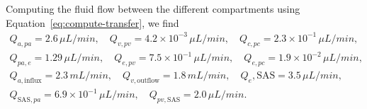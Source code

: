 \documentclass[a4paper,11pt]{article} %
\newcommand{\1}{^{(1)}}
\newcommand{\2}{^{(2)}}
\newcommand{\Cinulin}{$\prescript{14}{}{\text{C}}$-inulin }
\newcommand{\commentout}[1]{}
\providecommand{\DIFdeltex}[1]{{\protect\color{red}\sout{#1}}}                      %
\providecommand{\DIFaddbegin}{} %
\providecommand{\DIFaddend}{} %
\providecommand{\DIFdelbegin}{} %
\providecommand{\DIFdelend}{} %
\providecommand{\DIFdel}[1]{\texorpdfstring{\DIFdeltex{#1}}{}} %
\newcommand{\DIFscaledelfig}{0.5}
\newlength{\DIFdelgraphicswidth} %
\newlength{\DIFdelgraphicsheight} %
\newcommand{\DIFaddincludegraphics}[2][]{{\color{blue}\fbox{\DIFOincludegraphics[#1]{#2}}}} %
\newcommand{\DIFdelincludegraphics}[2][]{%
\sbox{\DIFdelgraphicsbox}{\DIFOincludegraphics[#1]{#2}}%
\settoboxwidth{\DIFdelgraphicswidth}{\DIFdelgraphicsbox} %
\settoboxtotalheight{\DIFdelgraphicsheight}{\DIFdelgraphicsbox} %
\scalebox{\DIFscaledelfig}{%
\parbox[b]{\DIFdelgraphicswidth}{\usebox{\DIFdelgraphicsbox}\\[-\baselineskip] \rule{\DIFdelgraphicswidth}{0em}}\llap{\resizebox{\DIFdelgraphicswidth}{\DIFdelgraphicsheight}{%
\setlength{\unitlength}{\DIFdelgraphicswidth}%
\begin{picture}(1,1)%
\thicklines\linethickness{2pt} %
{\color[rgb]{1,0,0}\put(0,0){\framebox(1,1){}}}%
{\color[rgb]{1,0,0}\put(0,0){\line( 1,1){1}}}%
{\color[rgb]{1,0,0}\put(0,1){\line(1,-1){1}}}%
\end{picture}%
}\hspace*{3pt}}} %
} %
\DeclareRobustCommand{\DIFaddbegin}{\DIFOaddbegin \let\includegraphics\DIFaddincludegraphics} %
\DeclareRobustCommand{\DIFaddend}{\DIFOaddend \let\includegraphics\DIFOincludegraphics} %
\DeclareRobustCommand{\DIFdelbegin}{\DIFOdelbegin \let\includegraphics\DIFdelincludegraphics} %
\DeclareRobustCommand{\DIFdelend}{\DIFOaddend \let\includegraphics\DIFOincludegraphics} %
\begin{document}
Computing the fluid flow between the different compartments using Equation~\eqref{eq:compute-transfer}, we find 
\[
\DIFdelbegin %
\DIFdelend \DIFaddbegin \begin{aligned}
    Q_{a,pa} = 2.6 \, \si{\mu L/min},\quad Q_{v,pv} = 4.2 \times 10^{-3} \, \si{\mu L/min},\quad Q_{c,pc} = 2.3\times 10^{-1}  \, \si{\mu L/min}, \\
    Q_{pa,e} = 1.29 \, \si{\mu L/min},\quad Q_{e,pv} = 7.5 \times 10^{-1}  \,\si{\mu L/min},\quad Q_{e,pc} = 1.9 \times 10^{-2} \, \si{\mu L/min}, \\
    Q_{a,\text{influx}} = 2.3 \, \si{mL/min} , \quad Q_{v,\text{outflow}  } = 1.8 \, \si{mL/min},\quad Q_{e},\text{SAS} = 3.5 \, \si{\mu L/min},\\
    Q_{\text{SAS},pa} = 6.9 \times 10^{-1}\,  \si{\mu L/min},\quad Q_{pv,\text{SAS}} = 2.0 \, \si{\mu L/min}.
\end{aligned}\DIFaddend 
\]
\DIFdelbegin %

\DIFdel{\commentout{
\begin{figure}[htbp]
         \centering
        \caption{Comparison of \Cinulin clearance for test case 2 with baseline parameter values and increse of ECS and PVSs porosities with test case 3. "MC Baseline" denotes the  clearance curve given by the multi-compartment model with baseline parameter values. The enhancements of ECS and PVSs porosities lead to the curve denoted "MC enhancement ECS+PVS" and the result of test case 3 is denoted "MC 7 compartements"}
\end{figure}
}
}\DIFdelend %
\end{document}
